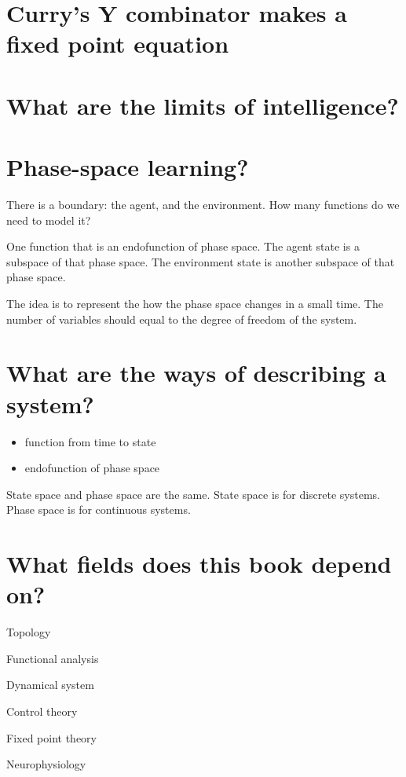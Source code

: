 \section{Curry's Y combinator makes a fixed point equation}

\section{What are the limits of intelligence?}

\section{Phase-space learning?}

There is a boundary: the agent, and the environment.
How many functions do we need to model it?

One function that is an endofunction of phase space.
The agent state is a subspace of that phase space.
The environment state is another subspace of that phase space.

The idea is to represent the how the phase space changes in a small time.
The number of variables should equal to the degree of freedom of the system.

\section{What are the ways of describing a system?}

\begin{itemize}
    \item function from time to state
    \item endofunction of phase space
\end{itemize}

State space and phase space are the same.
State space is for discrete systems.
Phase space is for continuous systems.

\section{What fields does this book depend on?}

Topology \cite{Topology}

Functional analysis

Dynamical system

Control theory

Fixed point theory

Neurophysiology

